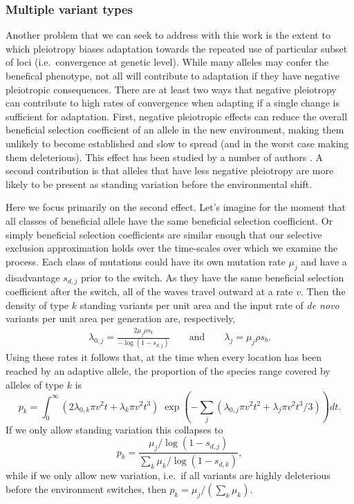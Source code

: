 \documentclass{article}
\begin{document}


\subsubsection{Multiple variant types}
Another problem that we can seek to address with this work is
the extent to which pleiotropy biases 
adaptation towards the repeated use of particular subset of loci
(i.e.\ convergence at genetic level). 
While many alleles may confer the benefical phenotype, 
not all will contribute to adaptation if they have negative pleiotropic consequences.
There are at least two ways that negative pleiotropy can contribute to high rates of convergence 
when adapting if a single change is sufficient for adaptation. 
First, negative pleiotropic effects can reduce 
the overall beneficial selection coefficient of an allele in the new environment,
making them unlikely to become established and slow to spread 
(and in the worst case making them deleterious). 
This effect has been studied by a number of authors \citep{REFS}. 
A second contribution is that alleles that have
less negative pleiotropy are more likely to be present as standing variation 
before the environmental shift.

Here we focus primarily on the second effect. 
Let's imagine for the moment that all classes of beneficial allele 
have the same beneficial selection coefficient. Or simply beneficial
selection coefficients are similar enough that our selective exclusion
approximation holds over the time-scales over which we examine the process.
Each class of mutations could have its own mutation rate $\mu_j$ and
have a disadvantage $s_{d,j}$ prior to the switch. 
As they have the same beneficial selection coefficient after the switch, 
all of the waves travel outward at a rate $v$. 
Then the density of type $k$ standing variants per unit area 
and the input rate of \textit{de novo} variants per unit area per generation are, respectively,
\begin{align}
  \lambda_{0,j} = \frac{ 2 \mu_j \rho s_b }{ -\log(1-s_{d,j}) } \qquad \text{and} \qquad    \lambda_{j} = \mu_j \rho s_b .
\end{align}
Using these rates it follows that, at the time when every location has been reached by an adaptive allele,
the proportion of the species range covered by alleles of type $k$ is
\begin{equation} \label{eqn-prop-space-allele-k}
    p_k = \int_0^\infty  \left( 2 \lambda_{0,k} \pi v^2 t + \lambda_k \pi v^2 t^3 \right)  
    \; \exp \left( - \sum_j ( \lambda_{0,j} \pi v^2 t^2 + \lambda_j \pi v^2 t^3 / 3 ) \right) dt .
\end{equation}
If we only allow standing variation this collapses to 
\begin{equation}  \label{eqn-prop-space-allele-k-standing-room-only}
    p_k = \frac{  \mu_j / \log(1-s_{d,j}) }{\sum_k  \mu_k / \log(1-s_{d,k}) } ,
\end{equation}
while if we only allow new variation, 
i.e.\ if all variants are highly deleterious before the environment switches, 
then $p_k =\mu_j / (\sum_k  \mu_k)$.
\end{document}
